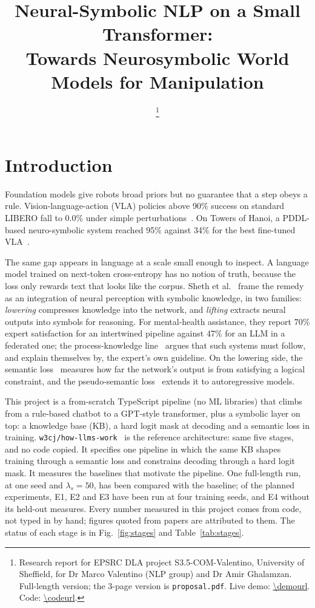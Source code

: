 \documentclass[letterpaper, 10pt, conference]{IEEEtran}
\title{\LARGE\bf Neural-Symbolic NLP on a Small Transformer:\\Towards Neurosymbolic World Models for Manipulation}
\author{\applicant\thanks{Research report for EPSRC DLA project S3.5-COM-Valentino, University of Sheffield, for Dr Marco Valentino (NLP group) and Dr Amir Ghalamzan. Full-length version; the 3-page version is \texttt{proposal.pdf}. Live demo: \url{\demourl}. Code: \url{\codeurl}.}}
\begin{document}
\maketitle
\thispagestyle{empty}
\pagestyle{empty}

\section{Introduction}
Foundation models give robots broad priors but no guarantee that a step obeys a rule. Vision-language-action (VLA) policies above 90\% success on standard LIBERO fall to 0.0\% under simple perturbations~\cite{liberopro}. On Towers of Hanoi, a PDDL-based neuro-symbolic system reached 95\% against 34\% for the best fine-tuned VLA~\cite{duggan}.

The same gap appears in language at a scale small enough to inspect. A language model trained on next-token cross-entropy has no notion of truth, because the loss only rewards text that looks like the corpus. Sheth et al.~\cite{sheth2023} frame the remedy as an integration of neural perception with symbolic knowledge, in two families: \emph{lowering} compresses knowledge into the network, and \emph{lifting} extracts neural outputs into symbols for reasoning. For mental-health assistance, they report 70\% expert satisfaction for an intertwined pipeline against 47\% for an LLM in a federated one; the process-knowledge line~\cite{sheth2022,roy2022} argues that such systems must follow, and explain themselves by, the expert's own guideline. On the lowering side, the semantic loss~\cite{xu2018} measures how far the network's output is from satisfying a logical constraint, and the pseudo-semantic loss~\cite{ahmed2023} extends it to autoregressive models.

This project is a from-scratch TypeScript pipeline (no ML libraries) that climbs from a rule-based chatbot to a GPT-style transformer, plus a symbolic layer on top: a knowledge base (KB), a hard logit mask at decoding and a semantic loss in training. \texttt{w3cj/how-llms-work}~\cite{w3cj} is the reference architecture: same five stages, and no code copied. It specifies one pipeline in which the same KB shapes training through a semantic loss and constrains decoding through a hard logit mask. It measures the baselines that motivate the pipeline. One full-length run, at one seed and $\lambda_s{=}50$, has been compared with the baseline; of the planned experiments, E1, E2 and E3 have been run at four training seeds, and E4 without its held-out measures. Every number measured in this project comes from code, not typed in by hand; figures quoted from papers are attributed to them. The status of each stage is in Fig.~\ref{fig:stages} and Table~\ref{tab:stages}.
\end{document}
